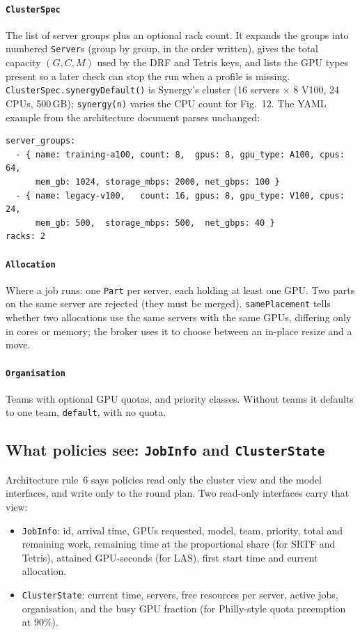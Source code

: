 \documentclass[11pt,a4paper]{article}
\newcommand{\code}[1]{\texttt{#1}}
\begin{document}
\paragraph{\code{ClusterSpec}} The list of server groups plus an optional rack count. It expands
the groups into numbered \code{Server}s (group by group, in the order written), gives the total
capacity $(G, C, M)$ used by the DRF and Tetris keys, and lists the GPU types present so a later
check can stop the run when a profile is missing. \code{ClusterSpec.synergyDefault()} is Synergy's
cluster (16 servers $\times$ 8 V100, 24 CPUs, 500\,GB); \code{synergy(n)} varies the CPU count for
Fig.~12. The YAML example from the architecture document parses unchanged:

\begin{lstlisting}
server_groups:
  - { name: training-a100, count: 8,  gpus: 8, gpu_type: A100, cpus: 64,
      mem_gb: 1024, storage_mbps: 2000, net_gbps: 100 }
  - { name: legacy-v100,   count: 16, gpus: 8, gpu_type: V100, cpus: 24,
      mem_gb: 500,  storage_mbps: 500,  net_gbps: 40 }
racks: 2
\end{lstlisting}

\paragraph{\code{Allocation}} Where a job runs: one \code{Part} per server, each holding at least
one GPU. Two parts on the same server are rejected (they must be merged). \code{samePlacement}
tells whether two allocations use the same servers with the same GPUs, differing only in cores
or memory; the broker uses it to choose between an in-place resize and a move.

\paragraph{\code{Organisation}} Teams with optional GPU quotas, and priority classes. Without
teams it defaults to one team, \code{default}, with no quota.

\subsection{What policies see: \code{JobInfo} and \code{ClusterState}}
Architecture rule~6 says policies read only the cluster view and the model interfaces, and write
only to the round plan. Two read-only interfaces carry that view:

\begin{itemize}
  \item \code{JobInfo}: id, arrival time, GPUs requested, model, team, priority, total and
        remaining work, remaining time at the proportional share (for SRTF and Tetris), attained
        GPU-seconds (for LAS), first start time and current allocation.
  \item \code{ClusterState}: current time, servers, free resources per server, active jobs,
        organisation, and the busy GPU fraction (for Philly-style quota preemption at 90\%).
\end{itemize}
\end{document}
